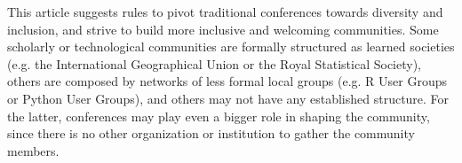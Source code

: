 \documentclass[10pt,letterpaper]{article}
\begin{document}
This article suggests rules to pivot traditional conferences towards diversity and inclusion, and strive to build more inclusive and welcoming communities. 
Some scholarly or technological communities are formally structured as learned societies (e.g. the International Geographical Union or the Royal Statistical Society), others are composed by networks of less formal local groups (e.g. R User Groups or Python User Groups), and others may not have any established structure. 
For the latter, conferences may play even a bigger role in shaping the community, since there is no other organization or institution to gather the community members. 
\end{document}
